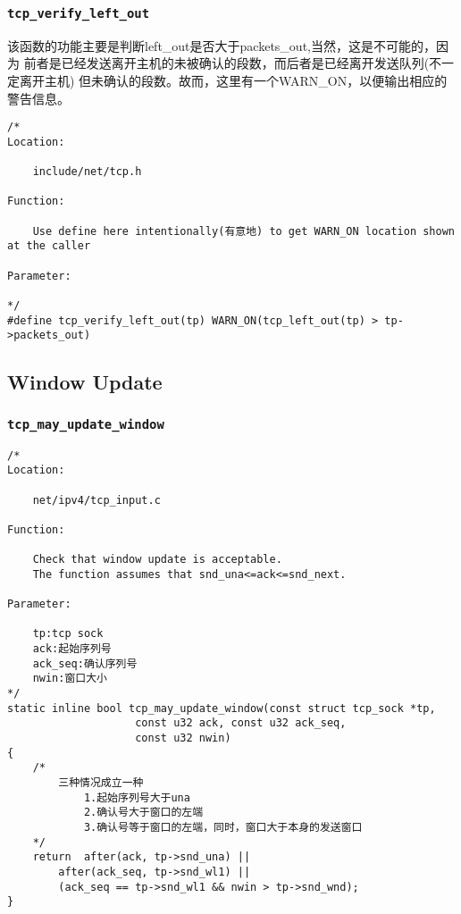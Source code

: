        \subsubsection{\texttt{tcp_verify_left_out}}
            该函数的功能主要是判断left\_out是否大于packets\_out,当然，这是不可能的，因为
            前者是已经发送离开主机的未被确认的段数，而后者是已经离开发送队列(不一定离开主机)
            但未确认的段数。故而，这里有一个WARN\_ON，以便输出相应的警告信息。
\begin{verbatim}
/* 
Location:

    include/net/tcp.h

Function:

    Use define here intentionally(有意地) to get WARN_ON location shown at the caller 

Parameter:

*/
#define tcp_verify_left_out(tp) WARN_ON(tcp_left_out(tp) > tp->packets_out)     
\end{verbatim}

    \subsection{Window Update}
        \subsubsection{\texttt{tcp_may_update_window}}
            \label{WindowUpdate:tcp_may_update_window}
\begin{verbatim}
/* 
Location:

    net/ipv4/tcp_input.c

Function:

    Check that window update is acceptable.
    The function assumes that snd_una<=ack<=snd_next.

Parameter:

    tp:tcp sock
    ack:起始序列号
    ack_seq:确认序列号
    nwin:窗口大小
*/
static inline bool tcp_may_update_window(const struct tcp_sock *tp,
                    const u32 ack, const u32 ack_seq,
                    const u32 nwin)
{
    /*
        三种情况成立一种
            1.起始序列号大于una
            2.确认号大于窗口的左端
            3.确认号等于窗口的左端，同时，窗口大于本身的发送窗口
    */
    return  after(ack, tp->snd_una) ||
        after(ack_seq, tp->snd_wl1) ||
        (ack_seq == tp->snd_wl1 && nwin > tp->snd_wnd);
}
\end{verbatim}
